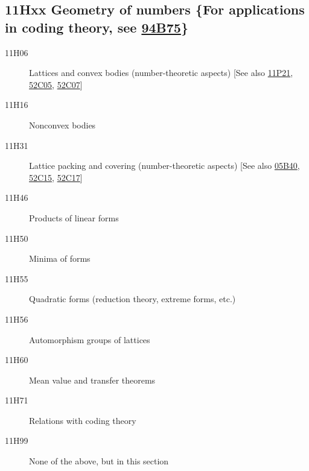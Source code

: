 \subsection*{11Hxx  Geometry of numbers \{For applications in coding theory, see \hyperref[94B75]{94B75}\} }\label{11Hxx}
\begin{description}  
\item [11H06]\label{11H06} Lattices and convex bodies (number-theoretic aspects) [See also \hyperref[11P21]{11P21}, \hyperref[52C05]{52C05}, \hyperref[52C07]{52C07}]
\item [11H16]\label{11H16} Nonconvex bodies
\item [11H31]\label{11H31} Lattice packing and covering (number-theoretic aspects) [See also \hyperref[05B40]{05B40}, \hyperref[52C15]{52C15}, \hyperref[52C17]{52C17}]
\item [11H46]\label{11H46} Products of linear forms
\item [11H50]\label{11H50} Minima of forms
\item [11H55]\label{11H55} Quadratic forms (reduction theory, extreme forms, etc.)
\item [11H56]\label{11H56} Automorphism groups of lattices
\item [11H60]\label{11H60} Mean value and transfer theorems
\item [11H71]\label{11H71} Relations with coding theory
\item [11H99]\label{11H99} None of the above, but in this section
\end{description}
